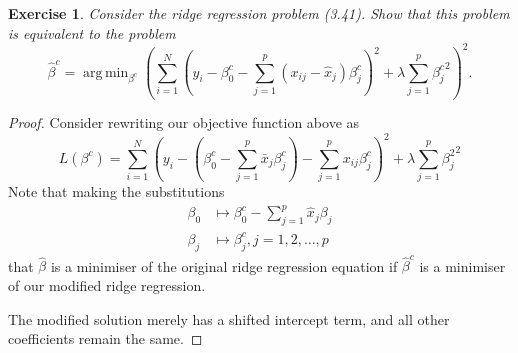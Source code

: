 \documentclass[12pt]{amsart}
\theoremstyle{plain}%
\newtheorem{exer}[thm]{Exercise}
\theoremstyle{definition}
\theoremstyle{remark}
\DeclareMathOperator*{\argmin}{arg\,min}
\begin{document}
\begin{exer}
    Consider the ridge regression problem (3.41).  Show that this problem is equivalent to the problem \[
        \hat \beta^c = \argmin_{\beta^c} \left( \sum_{i=1}^{N} \left( y_i - \beta^c_0 - \sum_{j=1}^{p}(x_{ij} - \hat x_j) \beta^c_j \right)^2 + \lambda \sum_{j=1}^{p}{\beta_j^c}^2 \right)^2.
        \]
\end{exer}
\begin{proof}
    Consider rewriting our objective function above as  \[
        L(\beta^c) = \sum_{i=1}^{N}\left(y_i - \left(\beta_0^c - \sum_{j=1}^{p} \bar x_j \beta_j^c \right) - \sum_{j=1}^p x_{ij} \beta_j^c \right)^2 + \lambda \sum_{j=1}^p {\beta_j^2}^2
        \]
    Note that making the substitutions \begin{align*}
        \beta_0 &\mapsto \beta_0^c - \sum_{j=1}^p \hat x_j \beta_j \\
        \beta_j &\mapsto \beta^c_j, j = 1, 2, \dots, p
    \end{align*} that $\hat \beta$ is a minimiser of the original ridge regression equation if $\hat \beta^c$ is a minimiser of our modified ridge regression.  

    The modified solution merely has a shifted intercept term, and all other coefficients remain the same.  
\end{proof}
\end{document}
